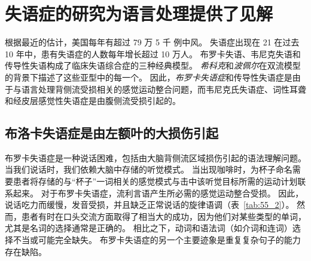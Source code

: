 \section{失语症的研究为语言处理提供了见解}

根据最近的估计，美国每年有超过 79 万 5 千 例中风。
失语症出现在 21%
在过去 10 年中，患有失语症的人数每年增长超过 10 万人。
布罗卡失语、韦尼克失语和传导性失语构成了临床失语综合症的三种经典模型。
\textit{希科克}和\textit{波佩尔}在双流模型的背景下描述了这些亚型中的每一个。
因此，\textit{布罗卡失语症}和传导性失语症是由于与语言处理背侧流受损相关的感觉运动整合问题，而韦尼克氏失语症、词性耳聋和经皮层感觉性失语症是由腹侧流受损引起的。



\subsection{布洛卡失语症是由左额叶的大损伤引起}

布罗卡失语症是一种说话困难，包括由大脑背侧流区域损伤引起的语法理解问题。
当我们说话时，我们依赖大脑中存储的听觉模式。
当出现咖啡时，为杯子命名需要患者将存储的与“杯子”一词相关的感觉模式与击中该听觉目标所需的运动计划联系起来。
对于布罗卡失语症，流利言语产生所必需的感觉运动整合受损。
因此，说话吃力而缓慢，发音受损，并且缺乏正常说话的旋律语调（表~\ref{tab:55_2}）。
然而，患者有时在口头交流方面取得了相当大的成功，因为他们对某些类型的单词，尤其是名词的选择通常是正确的。
相比之下，动词和语法词（如介词和连词）选择不当或可能完全缺失。
布罗卡失语症的另一个主要迹象是重复复杂句子的能力存在缺陷。


